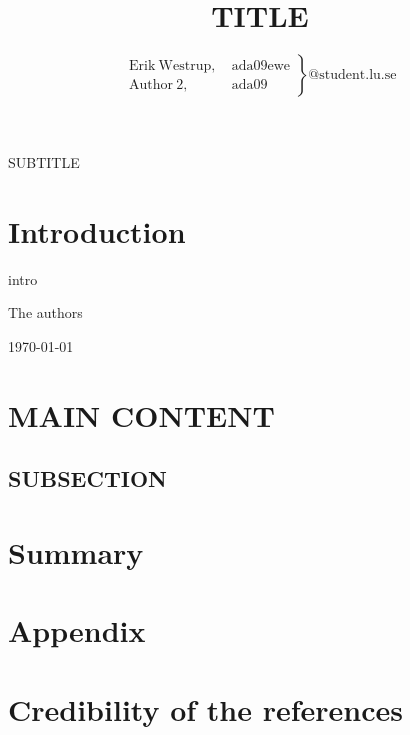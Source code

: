 \documentclass[10pt,journal,compsoc,final,twoside,twocolumn,a4paper]{IEEEtran}
\begin{document}
\title{TITLE}

\author{%
\begin{math}
\left. \begin{array}{ll}
	\mathrm{Erik~Westrup,} & \mathrm{~ada09ewe} \\
	\mathrm{Author~2,} & \mathrm{~ada09}
\end{array} \right\}\mathrm{@student.lu.se}
\end{math}
}

{SUBTITLE}

\maketitle
\IEEEdisplaynotcompsoctitleabstractindextext%
\IEEEpeerreviewmaketitle%

\section{Introduction}

 intro


\hfill The authors

\hfill \today


\section{MAIN CONTENT}
\lipsum[1-2]

\subsection{SUBSECTION}
\lipsum[1]

\section{Summary}




\newpage
\section*{Appendix}
\appendices%
\section{Credibility of the references}

\emph{\cite{dummy:ref}}
\end{document}
